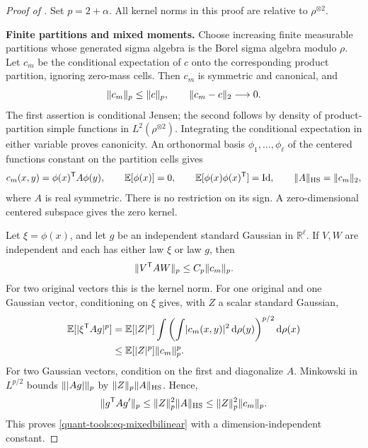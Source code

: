 \documentclass[11pt,reqno]{amsart}
\numberwithin{equation}{section}
\theoremstyle{plain}
\theoremstyle{remark}
\DeclarePairedDelimiter{\abs}{\lvert}{\rvert}
\DeclarePairedDelimiter{\norm}{\lVert}{\rVert}
\newcommand{\md}{\mathrm{d}}
\newcommand{\R}{{\mathbb{R}}}
\newcommand{\E}{{\mathbb{E}}}
\newcommand{\step}[1]{\par\medskip\noindent\textbf{#1}}
\begin{document}
\begin{proof}[Proof of ]
Set $p=2+\alpha$.  All kernel norms in this proof are relative to
$\rho^{\otimes2}$.

\step{Finite partitions and mixed moments.}
Choose increasing finite measurable partitions whose generated sigma
algebra is the Borel sigma algebra modulo $\rho$.  Let $c_m$ be the
conditional expectation of $c$ onto the corresponding product partition,
ignoring zero-mass cells.  Then $c_m$ is symmetric and canonical, and
\begin{equation}\label{quant-tools:eq-partitionbounds}
 \norm{c_m}_p\leq\norm c_p,\qquad
 \norm{c_m-c}_2\longrightarrow0.
\end{equation}
The first assertion is conditional Jensen; the second follows by density
of product-partition simple functions in $L^2(\rho^{\otimes2})$.
Integrating the conditional expectation in either variable proves
canonicity.  An orthonormal basis $\phi_1,\ldots,\phi_\ell$ of the
centered functions constant on the partition cells gives
\begin{equation}\label{quant-tools:eq-finitefeature}
 c_m(x,y)=\phi(x)^{\mathsf T}A\phi(y),\qquad
 \E[\phi(x)]=0,\qquad \E[\phi(x)\phi(x)^{\mathsf T}]=\mathrm{Id},
 \qquad\norm A_{\mathrm{HS}}=\norm{c_m}_2,
\end{equation}
where $A$ is real symmetric.  There is no restriction on its sign.
A zero-dimensional centered subspace gives the zero kernel.

Let $\xi=\phi(x)$, and let $g$ be an independent standard Gaussian in
$\R^\ell$.  If $V,W$ are independent and each has either law $\xi$ or
law $g$, then
\begin{equation}\label{quant-tools:eq-mixedbilinear}
 \norm{V^{\mathsf T}AW}_p\leq C_p\norm{c_m}_p.
\end{equation}
For two original vectors this is the kernel norm.  For one original and
one Gaussian vector, conditioning on $\xi$ gives, with $Z$ a scalar
standard Gaussian,
\begin{align}
 \E[\abs{\xi^{\mathsf T}Ag}^p]
 &=\E[\abs Z^p]\int
       \left(\int\abs{c_m(x,y)}^2\,\md\rho(y)\right)^{p/2}\md\rho(x)
 \notag\\
 &\leq\E[\abs Z^p]\norm{c_m}_p^p.
 \label{quant-tools:eq-mixedoriginal}
\end{align}
For two Gaussian vectors, condition on the first and diagonalize $A$.
Minkowski in $L^{p/2}$ bounds
$\norm{\abs{Ag}}_p$ by $\norm Z_p\norm A_{\mathrm{HS}}$.  Hence,
\begin{equation}\label{quant-tools:eq-mixedGaussian}
 \norm{g^{\mathsf T}Ag'}_p
 \leq\norm Z_p^2\norm A_{\mathrm{HS}}\leq\norm Z_p^2\norm{c_m}_p.
\end{equation}
This proves \eqref{quant-tools:eq-mixedbilinear} with a dimension-independent
constant.


\end{proof}
\end{document}
